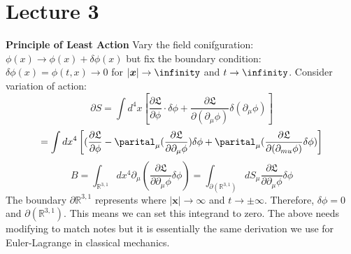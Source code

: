 \documentclass[12pt, a4paper, twoside, titlepage]{article}
\begin{document}
\section{Lecture 3}
\textbf{Principle of Least Action}
Vary the field conifguration: $\phi(x) \rightarrow \phi(x) + \delta \phi (x)$ but fix the boundary condition: $\delta \phi(x) = \phi(t,x) \rightarrow 0$ for $|\bm x| \rightarrow \infinity$ and $t \rightarrow \infinity$. Consider variation of action:
$$
\partial S = \int d^4 x \left[ \frac{\partial \mathfrak{L}}{\partial \phi} \cdot \delta \phi + \frac{\partial \mathfrak{L}}{\partial (\partial_{\mu} \phi)} \delta(\partial_{\mu} \phi)\right]
$$
$$
= \int dx^4 \left[ (\frac{\partial \mathfrak{L}}{\partial \phi} - \parital_{\mu} (\frac{\partial \mathfrak{L}}{\partial{\partial_{\mu} \phi}}  )\delta \phi + \parital_{\mu} (\frac{\partial \mathfrak{L}}{\partial (\partial_{mu} \phi) } \delta \phi) \right]
$$
$$
 B = \int_{\mathbb{R}^{3,1}} dx^4 \partial_{\mu} (\frac{\partial \mathfrak{L} }{\partial \partial_{\mu} \phi} \delta \phi) =  \int_{\partial(\mathbb{R}^{3,1})} dS_{\mu} \frac{\partial \mathfrak{L} }{\partial \partial_{\mu} \phi} \delta \phi
$$
The boundary $\partial \mathbb{R}^{3,1}$ represents where $| \bm x | \rightarrow \infty$ and $t \rightarrow \pm \infty$. Therefore, $\delta \phi = 0$ and $\partial (\mathbb{R}^{3,1})$. This means we can set this integrand to zero. The above needs modifying to match notes but it is essentially the same derivation we use for Euler-Lagrange in classical mechanics.
\end{document}
